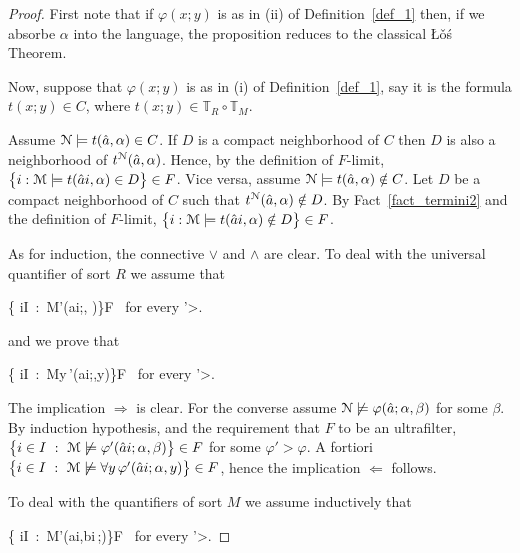 \documentclass[12pt,letterpaper,oneside,reqno]{amsart}
\theoremstyle{plain}
\theoremstyle{remark}
\begin{document}
\begin{proof}
  First note that if $\varphi(x;y)$ is as in (ii) of Definition~\ref{def_1} then, if we absorbe $\alpha$ into the language, the proposition reduces to the classical \L\v{o}\'s Theorem.

  Now, suppose that $\varphi(x;y)$ is as in (i) of Definition~\ref{def_1}, say it is the formula $t(x;y)\in C$, where $t(x;y)\in \mathds{T}_R\circ\mathds{T}_M$.
  
  Assume ${\EuScript N}\models t(\hat a,\alpha)\in C$.
  If $D$ is a compact neighborhood of $C$ then $D$ is also a neighborhood of $t^{\EuScript N}(\hat a,\alpha)$.
  Hence, by the definition of $F$-limit, $\big\{ i:{\EuScript M}\models t(\hat ai,\alpha)\in D\big\}\in F$.
  Vice versa, assume ${\EuScript N}\models t(\hat a,\alpha)\notin C$.
  Let $D$ be a compact neighborhood of $C$ such that $t^{\EuScript N}(\hat a,\alpha)\notin D$. 
  By Fact~\ref{fact_termini2} and the definition of $F$-limit, $\big\{ i:{\EuScript M}\models t(\hat ai,\alpha)\notin D\big\}\in F$.

  As for induction, the connective $\vee$ and $\wedge$ are clear.
  To deal with the universal quantifier of sort $R$ we assume that 
 
  {\Leftrightarrow}
  {\big\{ i\in I\ :\ {\EuScript M}\models\varphi'(\hat ai;\alpha, \beta)\big\}\in F \ \textrm{for every }\varphi'>\varphi.}
  
  and we prove that
 
  {\Leftrightarrow}
  {\big\{ i\in I\ :\ {\EuScript M}\models\forall y\,\varphi'(\hat ai;\alpha,y)\big\}\in F \ \textrm{for every }\varphi'>\varphi.}
  
  The implication $\Rightarrow$ is clear.
  For the converse assume ${\EuScript N}\not\models\varphi(\hat a; \alpha, \beta)$ for some $\beta$.
  By induction hypothesis, and the requirement that $F$ to be an ultrafilter, $\big\{ i\in I\ :\ {\EuScript M}\not\models\varphi'(\hat ai;\alpha,\beta)\big\}\in F$ for some $\varphi'>\varphi$.
  A fortiori $\big\{ i\in I\ :\ {\EuScript M}\not\models\forall y\,\varphi'(\hat ai;\alpha,y)\big\}\in F$, hence the implication $\Leftarrow$ follows.

  To deal with the quantifiers of sort $M$ we assume inductively that 

  {\Leftrightarrow}
  {\big\{ i\in I\ :\ {\EuScript M}\models\varphi'(\hat ai,\hat bi\,;\alpha)\big\}\in F \ \textrm{for every }\varphi'>\varphi.}
  

\end{proof}
\end{document}
